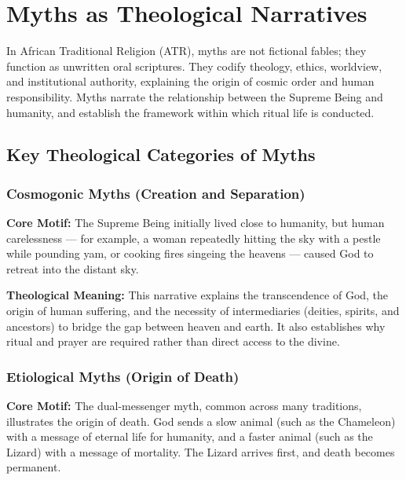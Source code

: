 \documentclass[12pt,a4paper]{article}
\begin{document}
\section{Myths as Theological Narratives}

In African Traditional Religion (ATR), myths are not fictional fables; they function as unwritten oral scriptures. They codify theology, ethics, worldview, and institutional authority, explaining the origin of cosmic order and human responsibility. Myths narrate the relationship between the Supreme Being and humanity, and establish the framework within which ritual life is conducted.

\subsection{Key Theological Categories of Myths}

\subsubsection{Cosmogonic Myths (Creation and Separation)}

\textbf{Core Motif:} The Supreme Being initially lived close to humanity, but human carelessness --- for example, a woman repeatedly hitting the sky with a pestle while pounding yam, or cooking fires singeing the heavens --- caused God to retreat into the distant sky.

\textbf{Theological Meaning:} This narrative explains the transcendence of God, the origin of human suffering, and the necessity of intermediaries (deities, spirits, and ancestors) to bridge the gap between heaven and earth. It also establishes why ritual and prayer are required rather than direct access to the divine.

\subsubsection{Etiological Myths (Origin of Death)}

\textbf{Core Motif:} The dual-messenger myth, common across many traditions, illustrates the origin of death. God sends a slow animal (such as the Chameleon) with a message of eternal life for humanity, and a faster animal (such as the Lizard) with a message of mortality. The Lizard arrives first, and death becomes permanent.
\end{document}
